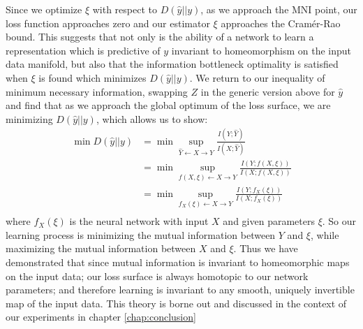 Since we optimize $\xi$ with respect to $D(\hat{y}||{y})$, as we approach the MNI point, our loss function approaches zero and our estimator $\xi$ approaches the Cram\'{e}r-Rao bound.
This suggests that not only is the ability of a network to learn a representation which is predictive of $y$ invariant to homeomorphism on the input data manifold, but also that the information bottleneck optimality is satisfied when $\xi$ is found which minimizes $D(\hat{y}||y)$.
We return to our inequality of minimum necessary information, swapping $Z$ in the generic version above for $\hat{y}$ and find that as we approach the global optimum of the loss surface, we are minimizing $D(\hat{y}||y)$, which allows us to show:
\begin{align*}
\min D(\hat{y}||y) & = \min \sup_{\hat{Y} \leftarrow X \rightarrow Y}\frac{I(Y; \hat{Y})}{I(X; \hat{Y})} \\
& = \min \sup_{f(X, \xi) \leftarrow X \rightarrow Y} \frac{I(Y; f(X, \xi))}{I(X; f(X, \xi))} \\
& = \min \sup_{f_X(\xi) \leftarrow X \rightarrow Y} \frac{I(Y; f_X(\xi))}{I(X; f_X(\xi))} \\
\end{align*}
where $f_X(\xi)$ is the neural network with input $X$ and given parameters $\xi$.
So our learning process is minimizing the mutual information between $Y$ and $\xi$, while maximizing the mutual information between $X$ and $\xi$.
Thus we have demonstrated that since mutual information is invariant to homeomorphic maps on the input data; our loss surface is always homotopic to our network parameters; and therefore learning is invariant to any smooth, uniquely invertible map of the input data. 
This theory is borne out and discussed in the context of our experiments in chapter \ref{chap:conclusion}
